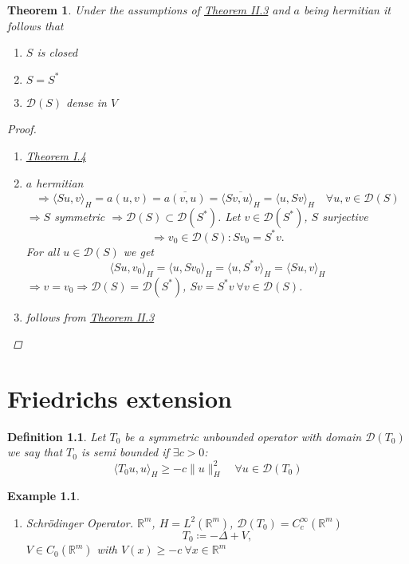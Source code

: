 \documentclass[12pt]{extreport} %
\newcommand{\R}{\mathbb{R}}
\newcommand{\DO}[1]{\mathcal{D}\left( {#1} \right)}
\theoremstyle{named}
\theoremstyle{nnamed}
\theoremstyle{itshape}
\newtheorem{definition}{Definition}  \counterwithin{definition}{chapter}
\newtheorem{theorem}{Theorem}  \counterwithin{theorem}{chapter}
\theoremstyle{normal}
\newtheorem*{example}{Example}
\begin{document}
\begin{theorem}
	Under the assumptions of \hyperref[thm:2.3]{Theorem II.3} and $a$ being hermitian it follows that
		\begin{enumerate}
			\item $S$ is closed
			\item $S = S^*$
			\item $\DO{S}$ dense in $V$
		\end{enumerate}
		
		\begin{proof} ~\
			\begin{enumerate}
				\item \hyperref[thm:1.4]{Theorem I.4}
				\item $a$ hermitian
					$$ \Rightarrow \langle Su, v \rangle_H = a(u, v) = \overline{a(v, u)} = \overline{\langle Sv, u \rangle_H} = \langle u, Sv \rangle_H \quad \forall u, v \in \DO{S} $$
					$\Rightarrow S$ symmetric $\Rightarrow \DO{S} \subset \DO{S^*}$. Let $v \in \DO{S^*}$, $S$ surjective 
						$$\Rightarrow v_0 \in \DO{S}: S v_0 = S^* v. $$ 
					For all $u \in \DO{S}$ we get
					$$ \langle Su, v_0 \rangle_H = \langle u, S v_0 \rangle_H = \langle u, S^* v \rangle_H = \langle S u, v \rangle_H $$
					$\Rightarrow v = v_0 \Rightarrow \DO{S} = \DO{S^*}$, $Sv = S^* v ~\forall v \in \DO{S}$.
				\item follows from \hyperref[thm:2.3]{Theorem II.3}
			\end{enumerate}	
		\end{proof}
\end{theorem}

\chapter{Friedrichs extension}

\begin{definition}
	Let $T_0$ be a symmetric unbounded operator with domain $\DO{T_0}$ we say that $T_0$ is semi bounded if $\exists c > 0$:
		$$ \langle T_0 u, u \rangle_H \geq - c \| u \|_H^2 \quad \forall u \in \DO{T_0} $$	
\end{definition}

\begin{example} ~\
	\begin{enumerate}
		\item Schrödinger Operator. $\R^m$, $H = L^2(\R^m)$, $\DO{T_0} = C_c^\infty(\R^m)$
				$$ T_0 \coloneqq - \Delta + V, $$
			$V \in C_0(\R^m)$ with $V(x) \geq - c ~\forall x \in \R^m$
	\end{enumerate}	
\end{example}
\end{document}
